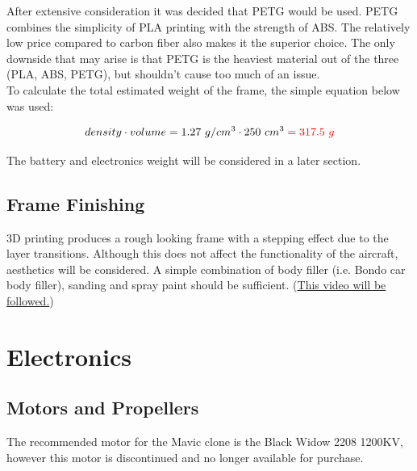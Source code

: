 \documentclass[12pt]{article}
\begin{document}
After extensive consideration it was decided that PETG would be used. PETG combines the simplicity of PLA printing with the strength of ABS. The relatively low price compared to carbon fiber also makes it the superior choice. The only downside that may arise is that PETG is the heaviest material out of the three (PLA, ABS, PETG), but shouldn't cause too much of an issue. 
\\

To calculate the total estimated weight of the frame, the simple equation below was used:

\begin{equation}
density \cdot volume = 1.27\ g/cm\textsuperscript{3} \cdot 250\ cm\textsuperscript{3} = {\color{red}317.5\ g}
\end{equation}

The battery and electronics weight will be considered in a later section.

\subsection{Frame Finishing}
3D printing produces a rough looking frame with a stepping effect due to the layer transitions. Although this does not affect the functionality of the aircraft, aesthetics will be considered. A simple combination of body filler (i.e. Bondo car body filler), sanding and spray paint should be sufficient. (\href{https://www.youtube.com/watch?v=NR2RF40Oq6M}{\color{cyan}This video will be followed.})

\section{Electronics}

\subsection{Motors and Propellers}
The recommended motor for the Mavic clone is the Black Widow 2208 1200KV, however this motor is discontinued and no longer available for purchase.
\\
\end{document}
